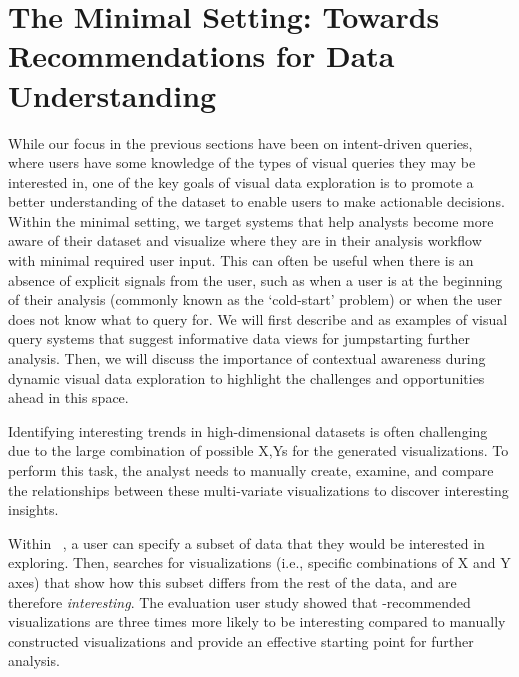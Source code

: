 \section{The Minimal Setting: Towards Recommendations for Data Understanding}\label{sec:minimal}
\par While our focus in the previous sections 
have been on intent-driven queries, 
where users have some knowledge 
of the types of visual queries they may be interested in, 
one of the key goals of visual data exploration 
is to promote a better understanding of the dataset 
to enable users to make actionable decisions. 
Within the minimal setting, we target
systems that help analysts become more 
aware of their dataset and visualize 
where they are in their analysis workflow 
with minimal required user input. 
This can often be useful when 
there is an absence of explicit signals from the user, 
such as when a user is at the 
beginning of their analysis 
(commonly known as the `cold-start' problem) 
or when the user does not know what to query for. 
We will first describe \seedb and \sbd as 
examples of visual query systems 
that suggest informative data views 
for jumpstarting further analysis. 
Then, we will discuss the importance 
of contextual awareness during dynamic visual data exploration to highlight the challenges and opportunities ahead in this space.

\smallskip
{}
Identifying interesting trends in 
high-dimensional datasets is often challenging 
due to the large combination of possible X,Ys 
for the generated visualizations. 
To perform this task, 
the analyst needs to manually create, 
examine, and compare the relationships 
between these multi-variate visualizations 
to discover interesting insights. 

\par Within \seedb~\cite{Vartak2015},
a user can specify a subset of data 
that they would be interested in exploring. 
Then, \seedb searches for visualizations
(i.e., specific combinations of X and Y axes)
that show how this subset differs from the rest 
of the data, and are
therefore {\em interesting}. 
The evaluation user study showed that 
\seedb-recommended visualizations are 
three times more likely to be interesting 
compared to manually constructed visualizations 
and provide an effective starting point for further analysis.


